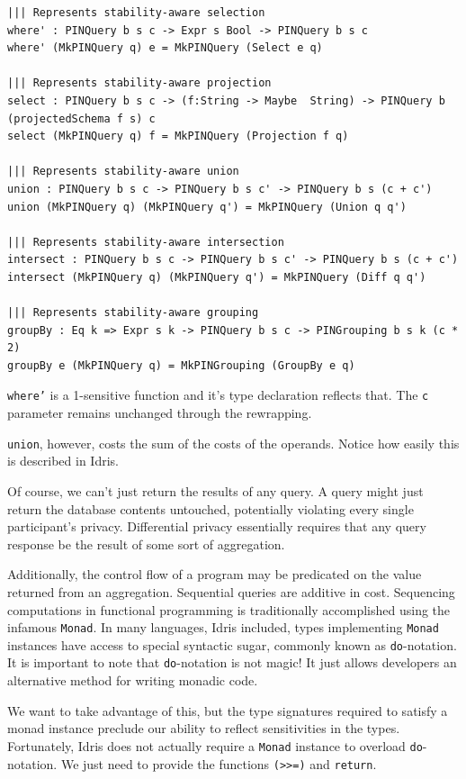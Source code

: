\documentclass[12pt]{article}
\begin{document}
\begin{lstlisting}
||| Represents stability-aware selection
where' : PINQuery b s c -> Expr s Bool -> PINQuery b s c
where' (MkPINQuery q) e = MkPINQuery (Select e q)

||| Represents stability-aware projection
select : PINQuery b s c -> (f:String -> Maybe  String) -> PINQuery b (projectedSchema f s) c
select (MkPINQuery q) f = MkPINQuery (Projection f q)

||| Represents stability-aware union
union : PINQuery b s c -> PINQuery b s c' -> PINQuery b s (c + c')
union (MkPINQuery q) (MkPINQuery q') = MkPINQuery (Union q q')

||| Represents stability-aware intersection
intersect : PINQuery b s c -> PINQuery b s c' -> PINQuery b s (c + c')
intersect (MkPINQuery q) (MkPINQuery q') = MkPINQuery (Diff q q')

||| Represents stability-aware grouping
groupBy : Eq k => Expr s k -> PINQuery b s c -> PINGrouping b s k (c * 2)
groupBy e (MkPINQuery q) = MkPINGrouping (GroupBy e q)
\end{lstlisting}

\texttt{where'} is a 1-sensitive function and it's type declaration reflects that.
The \texttt{c} parameter remains unchanged through the rewrapping.

\texttt{union}, however, costs the sum of the costs of the operands.
Notice how easily this is described in Idris.

Of course, we can't just return the results of any query.
A query might just return the database contents untouched, potentially violating every single participant's privacy.
Differential privacy essentially requires that any query response be the result of some sort of aggregation.

Additionally, the control flow of a program may be predicated on the value returned from an aggregation.
Sequential queries are additive in cost.
Sequencing computations in functional programming is traditionally accomplished using the infamous \texttt{Monad}.
In many languages, Idris included, types implementing \texttt{Monad} instances have access to special syntactic sugar, commonly known as \texttt{do}-notation.
It is important to note that \texttt{do}-notation is not magic!
It just allows developers an alternative method for writing monadic code.

We want to take advantage of this, but the type signatures required to satisfy a monad instance preclude our ability to reflect sensitivities in the types.
Fortunately, Idris does not actually require a \texttt{Monad} instance to overload \texttt{do}-notation.
We just need to provide the functions \texttt{(>>=)} and \texttt{return}.
\end{document}
